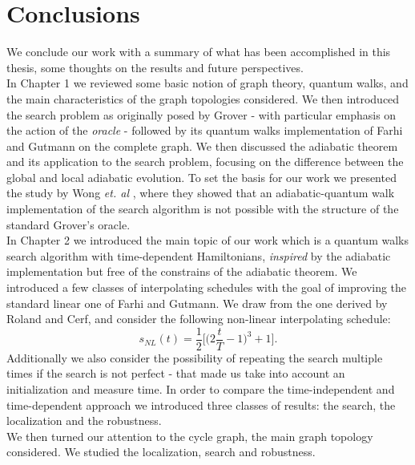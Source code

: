\newpage


\chapter*{\textbf{Conclusions}}

\vspace{-1cm}
We conclude our work with a summary of what has been accomplished in this thesis, some thoughts on the results and future perspectives. \\

In Chapter 1 we reviewed some basic notion of graph theory, quantum walks, and the main characteristics of the graph topologies considered. We then introduced the search problem as originally posed by Grover - with particular emphasis on the action of the \textit{oracle} - followed by its quantum walks implementation of Farhi and Gutmann on the complete graph. We then discussed the adiabatic theorem and its application to the search problem, focusing on the difference between the global and local adiabatic evolution. To set the basis for our work we presented the study by Wong \textit{et. al} \cite{Wong2016}, where they showed that an adiabatic-quantum walk implementation of the search algorithm is not possible with the structure of the standard Grover's oracle. \\

In Chapter 2 we introduced the main topic of our work which is a quantum walks search algorithm with time-dependent Hamiltonians, \textit{inspired} by the adiabatic implementation but free of the constrains of the adiabatic theorem. We introduced a few classes of interpolating schedules with the goal of improving the standard linear one of Farhi and Gutmann. We draw from the one derived by Roland and Cerf, and consider the following non-linear interpolating schedule:
\begin{equation*}
  s_{NL}(t)  = \frac{1}{2}\Big[\big(2\frac{t}{T} - 1\big)^3 +1\Big].
\end{equation*}
Additionally we also consider the possibility of repeating the search multiple times if the search is not perfect - that made us take into account an initialization and measure time. In order to compare the time-independent and time-dependent approach we introduced three classes of results: the search, the localization and the robustness. \\

We then turned our attention to the cycle graph, the main graph topology considered. We studied the localization, search and robustness. \\


